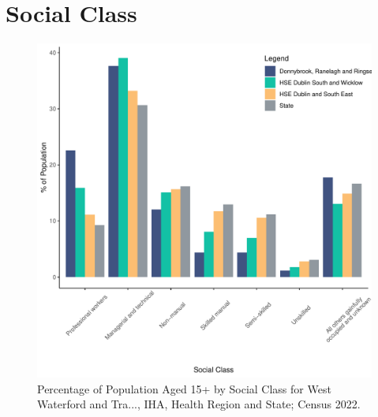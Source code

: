 \documentclass{article}
\begin{document}
\section{Social Class}\label{sect:SC}
\begin{figure}[H]
	\centering
	\includegraphics[width = 140mm]{../figures/SocialClassED.pdf}
	\caption{Percentage of Population Aged 15+ by Social Class for West Waterford and Tra..., IHA, Health Region and State; Census 2022.}
	\label{fig:vbnv}
	\end{figure}
\end{document}
